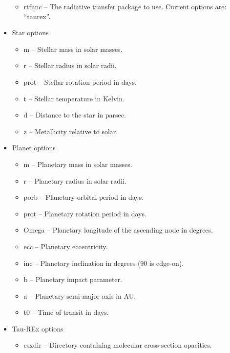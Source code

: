 \documentclass[12pt]{article}
\begin{document}
\begin{itemize}
\begin{itemize}
  \item rtfunc -- The radiative transfer package to use. Current
    options are: ``taurex''.
  \end{itemize}
\item Star options
  \begin{itemize}
  \item m -- Stellar mass in solar masses.

  \item r -- Stellar radius in solar radii.

  \item prot -- Stellar rotation period in days.

  \item t -- Stellar temperature in Kelvin.

  \item d -- Distance to the star in parsec.

  \item z -- Metallicity relative to solar.
  \end{itemize}
\item Planet options
  \begin{itemize}
  \item m -- Planetary mass in solar masses.

  \item r -- Planetary radius in solar radii.

  \item porb -- Planetary orbital period in days.

  \item prot -- Planetary rotation period in days.

  \item Omega -- Planetary longitude of the ascending node in degrees.

  \item ecc -- Planetary eccentricity.

  \item inc -- Planetary inclination in degrees (90 is edge-on).

  \item b -- Planetary impact parameter.

  \item a -- Planetary semi-major axis in AU.

  \item t0 -- Time of transit in days.
  \end{itemize}
\item Tau-REx options
  \begin{itemize}
  \item csxdir -- Directory containing molecular cross-section opacities.


\end{itemize}
\end{itemize}
\end{document}
